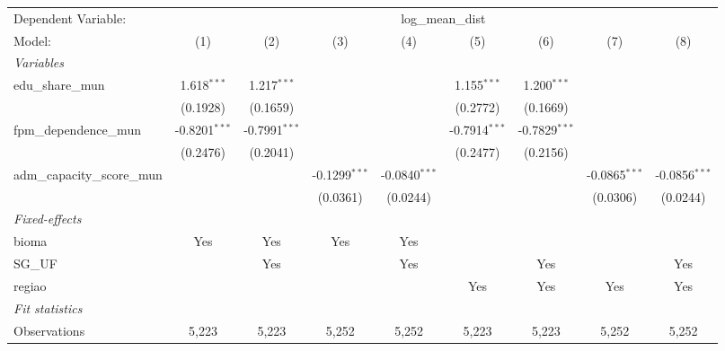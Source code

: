 \begingroup
\centering
\begin{tabular}{lcccccccc}
   \tabularnewline \midrule \midrule
   Dependent Variable: & \multicolumn{8}{c}{log\_mean\_dist}\\
   Model:                       & (1)             & (2)             & (3)             & (4)             & (5)             & (6)             & (7)             & (8)\\  
   \midrule
   \emph{Variables}\\
   edu\_share\_mun              & 1.618$^{***}$   & 1.217$^{***}$   &                 &                 & 1.155$^{***}$   & 1.200$^{***}$   &                 &   \\   
                                & (0.1928)        & (0.1659)        &                 &                 & (0.2772)        & (0.1669)        &                 &   \\   
   fpm\_dependence\_mun         & -0.8201$^{***}$ & -0.7991$^{***}$ &                 &                 & -0.7914$^{***}$ & -0.7829$^{***}$ &                 &   \\   
                                & (0.2476)        & (0.2041)        &                 &                 & (0.2477)        & (0.2156)        &                 &   \\   
   adm\_capacity\_score\_mun    &                 &                 & -0.1299$^{***}$ & -0.0840$^{***}$ &                 &                 & -0.0865$^{***}$ & -0.0856$^{***}$\\   
                                &                 &                 & (0.0361)        & (0.0244)        &                 &                 & (0.0306)        & (0.0244)\\   
   \midrule
   \emph{Fixed-effects}\\
   bioma                        & Yes             & Yes             & Yes             & Yes             &                 &                 &                 & \\  
   SG\_UF                       &                 & Yes             &                 & Yes             &                 & Yes             &                 & Yes\\  
   regiao                       &                 &                 &                 &                 & Yes             & Yes             & Yes             & Yes\\  
   \midrule
   \emph{Fit statistics}\\
   Observations                 & 5,223           & 5,223           & 5,252           & 5,252           & 5,223           & 5,223           & 5,252           & 5,252\\  

\end{tabular}
